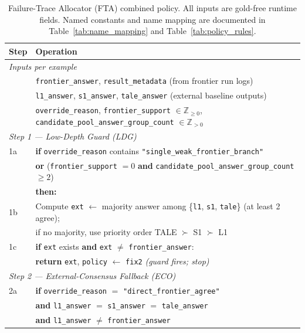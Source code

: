 \documentclass[smallcondensed]{svjour3}
\begin{document}
\begin{table}[t]
\centering
\caption{Failure-Trace Allocator (FTA) combined policy.
All inputs are gold-free runtime fields.
Named constants and name mapping are documented in
Table~\ref{tab:name_mapping} and Table~\ref{tab:policy_rules}.}
\label{alg:fix24}
\scriptsize
\begin{tabular}{p{} p{}}
\toprule
\textbf{Step} & \textbf{Operation} \\
\midrule
\multicolumn{2}{l}{\textit{Inputs per example}} \\
& \texttt{frontier\_answer}, \texttt{result\_metadata} (from frontier run logs) \\
& \texttt{l1\_answer}, \texttt{s1\_answer}, \texttt{tale\_answer} (external baseline outputs) \\
& \texttt{override\_reason}, \texttt{frontier\_support} $\in \mathbb{Z}_{\geq 0}$, \texttt{candidate\_pool\_answer\_group\_count} $\in \mathbb{Z}_{>0}$ \\
\midrule
\multicolumn{2}{l}{\textit{Step 1 --- Low-Depth Guard (LDG)}} \\
1a & \textbf{if} \texttt{override\_reason} contains \texttt{"single\_weak\_frontier\_branch"} \\
   & \quad \textbf{or} (\texttt{frontier\_support} $= 0$ \textbf{and} \texttt{candidate\_pool\_answer\_group\_count} $\geq 2$) \\
   & \textbf{then:} \\
1b & \quad Compute \texttt{ext} $\leftarrow$ majority answer among \{\texttt{l1}, \texttt{s1}, \texttt{tale}\} (at least 2 agree); \\
   & \quad if no majority, use priority order TALE $\succ$ S1 $\succ$ L1 \\
1c & \quad \textbf{if} \texttt{ext} exists \textbf{and} \texttt{ext} $\neq$ \texttt{frontier\_answer}: \\
   & \quad\quad \textbf{return} \texttt{ext}, \texttt{policy} $\leftarrow$ \texttt{fix2} \quad\quad \textit{(guard fires; stop)} \\
\midrule
\multicolumn{2}{l}{\textit{Step 2 --- External-Consensus Fallback (ECO)}} \\
2a & \textbf{if} \texttt{override\_reason} $=$ \texttt{"direct\_frontier\_agree"} \\
   & \quad \textbf{and} \texttt{l1\_answer} $=$ \texttt{s1\_answer} $=$ \texttt{tale\_answer} \\
   & \quad \textbf{and} \texttt{l1\_answer} $\neq$ \texttt{frontier\_answer} \\

\end{tabular}
\end{table}
\end{document}
